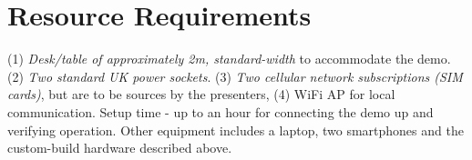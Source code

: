 \documentclass{sig-alternate-10pt}
\begin{document}

\section*{Resource Requirements}

(1) \emph{Desk/table of approximately 2m, standard-width} to accommodate the demo. (2) \emph{Two standard UK power sockets}. (3) \emph{Two cellular network subscriptions (SIM cards)}, but are to be sources by the presenters, (4) WiFi AP for local communication. Setup time - up to an hour for connecting the demo up and verifying operation. Other equipment includes a laptop, two smartphones and the custom-build hardware described above.


{\footnotesize 


}

%
\end{document}
